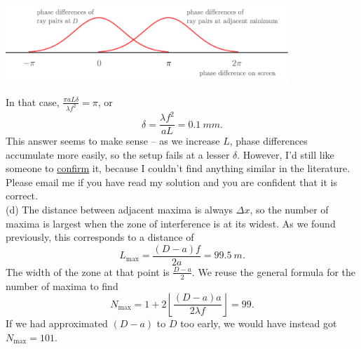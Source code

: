 \documentclass[../TST.tex]{subfiles}
\begin{document}
\begin{solution}
\begin{center}
\includegraphics[width=0.8\textwidth]{fig/a2009_s64.pdf}
\end{center}

In that case, $\frac{\pi a L\delta}{\lambda f^2}=\pi$, or 
\begin{equation*}
	\boxed{\delta = \frac{\lambda f^2}{aL} = \qty{0.1}{mm}.}
\end{equation*}
This answer seems to make sense -- as we increase $L$, phase differences accumulate more easily, so the setup fails at a lesser $\delta$. However, I'd still like someone to \underline{confirm} it, because I couldn't find anything similar in the literature. Please email me if you have read my solution and you are confident that it is correct. \\

(d) The distance between adjacent maxima is always $\Delta x$, so the number of maxima is largest when the zone of interference is at its widest. As we found previously, this corresponds to a distance of 
\begin{equation*}
	\boxed{L_\mathrm{max}=\frac{(D-a)f}{2a}=\qty{99.5}{m}.}
\end{equation*}
The width of the zone at that point is $\frac{D-a}{2}$. We reuse the general formula for the number of maxima to find
\begin{equation*}
\boxed{N_\mathrm{max}=1+2\left\lfloor \frac{(D-a)a}{2\lambda f}  \right\rfloor = 99.}
\end{equation*}
If we had approximated $(D-a)$ to $D$ too early, we would have instead got $N_\mathrm{max}=101$.
\end{solution}
\fi
\end{document}
